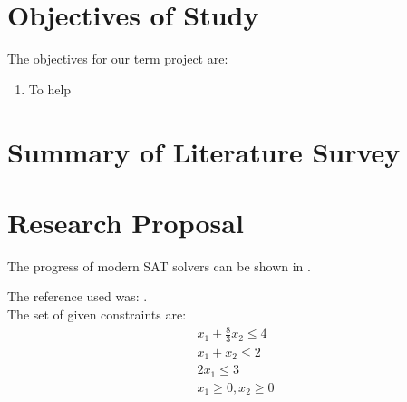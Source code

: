 \documentclass[letter,12pt]{article}
\begin{document}
%	







\section{Objectives of Study}
\label{sec:objectivesofstudy}

The objectives for our term project are: \vspace{-0.3cm}
\begin{enumerate} \itemsep -4pt
\item To help 
\end{enumerate}



\section{Summary of Literature Survey}
\label{sec:summaryofliteraturesurvey}



\section{Research Proposal}
\label{sec:summaryofliteraturesurvey}

The progress of modern SAT solvers can be shown in \cite[Fig. 1.2, pp. 5, Chapter 1]{Samulowitz2008} \cite[slide 7]{Sabharwal2011} \cite[slide 7]{Sabharwal2007}.

\cite[slide 9]{Ganesh2013}






The reference used was: \cite[\S2.5, pages 25--27]{Luenberger2008}. \\

The set of given constraints are:
\begin{eqnarray*}
x_{1} + \frac{8}{3}x_{2} \leq 4 \\
x_{1} + x_{2} \leq 2 \\
2x_{1} \leq 3 \\
x_{1} \geq 0, x_{2} \geq 0
\end{eqnarray*}
\end{document}
